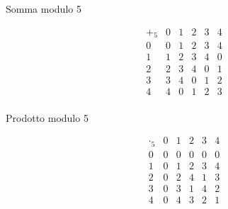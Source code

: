 \documentclass[a4paper,12pt]{article}
\begin{document}
	\begin{table}[h!]
		\centering
		\begin{minipage}{0.45\textwidth}
			\centering
			\caption*{Somma modulo 5}
			\[
			\begin{array}{c|ccccc}
				+_5 & 0 & 1 & 2 & 3 & 4 \\
				\hline
				0 & 0 & 1 & 2 & 3 & 4 \\
				1 & 1 & 2 & 3 & 4 & 0 \\
				2 & 2 & 3 & 4 & 0 & 1 \\
				3 & 3 & 4 & 0 & 1 & 2 \\
				4 & 4 & 0 & 1 & 2 & 3 \\
			\end{array}
			\]
		\end{minipage}
		\hfill
		\begin{minipage}{0.45\textwidth}
			\centering
			\caption*{Prodotto modulo 5}
			\[
			\begin{array}{c|ccccc}
				\cdot_5 & 0 & 1 & 2 & 3 & 4 \\
				\hline
				0 & 0 & 0 & 0 & 0 & 0 \\
				1 & 0 & 1 & 2 & 3 & 4 \\
				2 & 0 & 2 & 4 & 1 & 3 \\
				3 & 0 & 3 & 1 & 4 & 2 \\
				4 & 0 & 4 & 3 & 2 & 1 \\
			\end{array}
			\]
		\end{minipage}
	\end{table}
	
\end{document}
